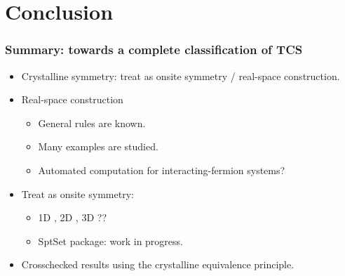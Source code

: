 \documentclass[xcolor=table, 11pt, aspectratio=169]{beamer}
\begin{document}
\section{Conclusion}

\begin{frame}
\frametitle{Summary: towards a complete classification of TCS}
\begin{itemize}
\item Crystalline symmetry: treat as onsite symmetry / real-space construction.
\item Real-space construction
  \begin{itemize}
  \item General rules are known.
  \item Many examples are studied.
  \item Automated computation for interacting-fermion systems?
  \end{itemize}
\item Treat as onsite symmetry:
  \begin{itemize}
  \item 1D , 2D , 3D ??
  \item SptSet package: work in progress.
  \end{itemize}
\item Crosschecked results using the crystalline equivalence principle.
\end{itemize}
\end{frame}
\end{document}

